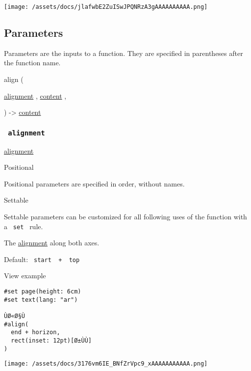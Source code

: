 \texttt{[image: /assets/docs/jlafwbE2ZuISwJPQNRzA3gAAAAAAAAAA.png]}

\subsection{\texorpdfstring{{ Parameters
}}{ Parameters }}\label{parameters}

\label{parameters-tooltip}
Parameters are the inputs to a function. They are specified in
parentheses after the function name.

{ align } (

{ \hyperref[parameters-alignment]{}
\href{/docs/reference/layout/alignment/}{alignment} , } {
\href{/docs/reference/foundations/content/}{content} , }

) -\textgreater{} \href{/docs/reference/foundations/content/}{content}

\subsubsection{\texorpdfstring{\texttt{\ alignment\ }}{ alignment }}\label{parameters-alignment}

\href{/docs/reference/layout/alignment/}{alignment}

{{ Positional }}

\label{parameters-alignment-positional-tooltip}
Positional parameters are specified in order, without names.

{{ Settable }}

\label{parameters-alignment-settable-tooltip}
Settable parameters can be customized for all following uses of the
function with a \texttt{\ set\ } rule.

The \href{/docs/reference/layout/alignment/}{alignment} along both axes.

Default: \texttt{\ start\ }{\texttt{\ +\ }}\texttt{\ top\ }


View example

\begin{verbatim}
#set page(height: 6cm)
#set text(lang: "ar")

ÙØ«Ø§Ù
#align(
  end + horizon,
  rect(inset: 12pt)[Ø±ÙÙ]
)
\end{verbatim}

\texttt{[image: /assets/docs/3176vm6IE\_BNfZrVpc9\_xAAAAAAAAAAA.png]}

